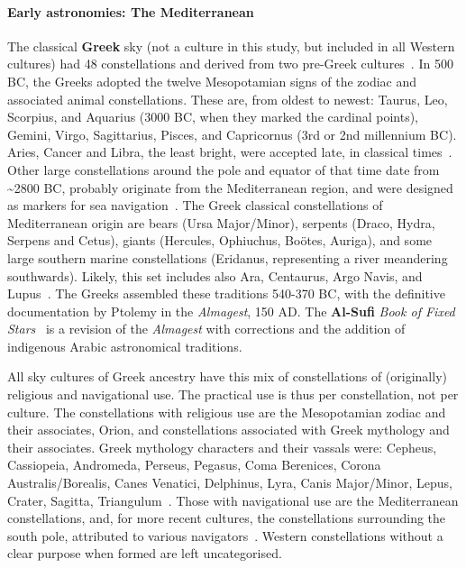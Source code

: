 \documentclass[10pt]{article}
\begin{document}
\paragraph{Early astronomies: The Mediterranean} The classical {\bf Greek} sky (not a culture in this study, but included in all Western cultures) had 48 constellations and derived from two pre-Greek cultures~\cite{rogers1998origins1,rogers1998origins2}. In 500 BC, the Greeks adopted the twelve Mesopotamian signs of the zodiac and associated animal constellations. These are, from oldest to newest: Taurus, Leo, Scorpius, and Aquarius (3000 BC, when they marked the cardinal points), Gemini, Virgo, Sagittarius, Pisces, and Capricornus (3rd or 2nd millennium BC). Aries, Cancer and Libra, the least bright, were accepted late, in classical times~\cite{rogers1998origins2}. Other large constellations around the pole and equator of that time date from \textasciitilde2800 BC, probably originate from the Mediterranean region, and were designed as markers for sea navigation~\cite{rogers1998origins2}. The Greek classical constellations of Mediterranean origin are bears (Ursa Major/Minor), serpents (Draco, Hydra, Serpens and Cetus), giants (Hercules, Ophiuchus, Bo\"otes, Auriga), and some large southern marine constellations (Eridanus, representing a river meandering southwards). Likely, this set includes also Ara, Centaurus, Argo Navis, and Lupus~\cite{rogers1998origins2}. The Greeks assembled these traditions 540-370 BC, with the definitive documentation by Ptolemy in the \textit{Almagest}, 150 AD. The {\bf Al-Sufi} \textit{Book of Fixed Stars}~\cite{Al_Sufi_Book} is a revision of the \textit{Almagest} with corrections and the addition of indigenous Arabic astronomical traditions.

All sky cultures of Greek ancestry have this mix of constellations of (originally) religious and navigational use. The practical use is thus per constellation, not per culture. The constellations with religious use are the Mesopotamian zodiac and their associates, Orion, and constellations associated with Greek mythology and their associates. Greek mythology characters and their vassals were: Cepheus, Cassiopeia, Andromeda, Perseus, Pegasus, Coma Berenices, Corona Australis/Borealis, Canes Venatici, Delphinus, Lyra, Canis Major/Minor, Lepus, Crater, Sagitta, Triangulum~\cite{rogers1998origins2,allen2013star}. Those with navigational use are the Mediterranean constellations, and, for more recent cultures, the constellations surrounding the south pole, attributed to various navigators~\cite{sawyer1951out}. Western constellations without a clear purpose when formed are left uncategorised.
\end{document}
